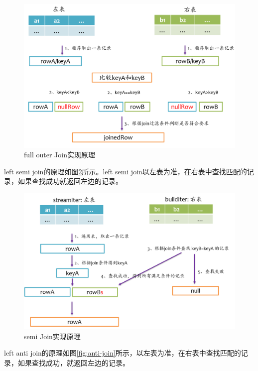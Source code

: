 \begin{figure}[htbp]
    \centering
    \includegraphics[width=1\textwidth]{Img/spark-sql-fullouter-join.png}
    \caption{full outer Join实现原理}
    \label{fig:fullouter-join}
\end{figure}

left semi join的原理如图\ref{fig:semi-join}所示。left semi join以左表为准，在右表中查找匹配的记录，如果查找成功就返回左边的记录。

\begin{figure}[htbp]
    \centering
    \includegraphics[width=1\textwidth]{Img/spark-sql-semi-join.png}
    \caption{semi Join实现原理}
    \label{fig:semi-join}
\end{figure}

left anti join的原理如图\ref{fig:anti-join}所示，以左表为准，在右表中查找匹配的记录，如果查找成功，就返回左边的记录。

